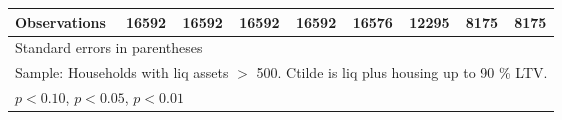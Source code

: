 {\begin{longtable}{l*{8}{c}}
Observations        &       16592         &       16592         &       16592         &       16592         &       16576         &       12295         &        8175         &        8175         \\
\bottomrule
\multicolumn{9}{l}{\footnotesize Standard errors in parentheses}\\
\multicolumn{9}{l}{\footnotesize Sample: Households with liq assets $>$ 500. Ctilde is liq plus housing up to 90 \% LTV.}\\
\multicolumn{9}{l}{\footnotesize \sym{*} \(p<0.10\), \sym{**} \(p<0.05\), \sym{***} \(p<0.01\)}\\
\end{longtable}
}
